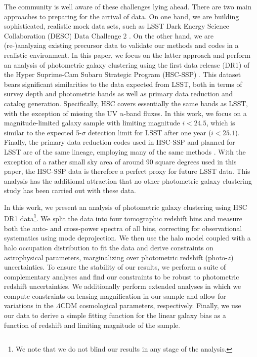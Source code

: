\documentclass[a4paper,11pt]{article}
\begin{document}
  The community is well aware of these challenges lying ahead. There are two main approaches to preparing for the arrival of data. On one hand, we are building sophisticated, realistic mock data sets, such as LSST Dark Energy Science Collaboration (DESC) Data Challenge 2 \cite{1909.07340,1907.06530}. On the other hand, we are (re-)analyzing existing precursor data to validate our methods and codes in a realistic environment. In this paper, we focus on the latter approach and perform an analysis of photometric galaxy clustering using the first data release (DR1) of the Hyper Suprime-Cam Subaru Strategic Program (HSC-SSP) \cite{2018PASJ...70S...8A}. This dataset bears significant similarities to the data expected from LSST, both in terms of survey depth and photometric bands as well as primary data reduction and catalog generation. Specifically, HSC covers essentially the same bands as LSST, with the exception of missing the UV $u$-band fluxes. In this work, we focus on a magnitude-limited galaxy sample with limiting magnitude $i<24.5$, which is similar to the expected 5-$\sigma$ detection limit for LSST after one year \cite{1809.01669} ($i<25.1$). Finally, the primary data reduction codes used in HSC-SSP and planned for LSST are of the same lineage, employing many of the same methods \cite{2018PASJ...70S...5B,1812.03248}. With the exception of a rather small sky area of around 90 square degrees used in this paper, the HSC-SSP data is therefore a perfect proxy for future LSST data. This analysis has the additional attraction that no other photometric galaxy clustering study has been carried out with these data.

  In this work, we present an analysis of photometric galaxy clustering using HSC DR1 data\footnote{We note that we do not blind our results in any stage of the analysis.}. We split the data into four tomographic redshift bins and measure both the auto- and cross-power spectra of all bins, correcting for observational systematics using mode deprojection. We then use the halo model coupled with a halo occupation distribution to fit the data and derive constraints on astrophysical parameters, marginalizing over photometric redshift (photo-$z$) uncertainties. To ensure the stability of our results, we perform a suite of complementary analyses and find our constraints to be robust to photometric redshift uncertainties. We additionally perform extended analyses in which we compute constraints on lensing magnification in our sample and allow for variations in the $\Lambda$CDM cosmological parameters, respectively. Finally, we use our data to derive a simple fitting function for the linear galaxy bias as a function of redshift and limiting magnitude of the sample.
\end{document}
